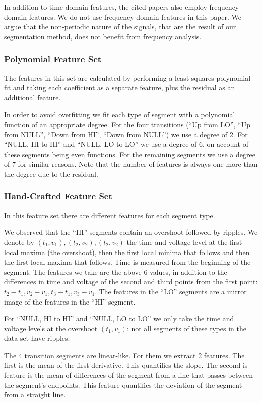 \documentclass[conference]{IEEEtran}
\begin{document}
  In addition to time-domain features, the cited papers also employ frequency-domain features. We do not use frequency-domain features in this paper. We argue that the non-periodic nature of the signals, that are the result of our segmentation method, does not benefit from frequency analysis.

\subsubsection{Polynomial Feature Set}
  The features in this set are calculated by performing a least squares polynomial fit and taking each coefficient as a separate feature, plus the residual as an additional feature.
  
  In order to avoid overfitting we fit each type of segment with a polynomial function of an appropriate degree. For the four transitions (``Up from LO'', ``Up from NULL'', ``Down from HI'', ``Down from NULL'') we use a degree of 2. For ``NULL, HI to HI'' and ``NULL, LO to LO'' we use a degree of 6, on account of these segments being even functions. For the remaining segments we use a degree of 7 for similar reasons. Note that the number of features is always one more than the degree due to the residual.
  
\subsubsection{Hand-Crafted Feature Set}

  In this feature set there are different features for each segment type.
  
  We observed that the ``HI'' segments contain an overshoot followed by ripples. We denote by \((t_1, v_1), (t_2, v_2), (t_2, v_2)\) the time and voltage level at the first local maxima (the overshoot), then the first local minima that follows and then the first local maxima that follows. Time is measured from the beginning of the segment. The features we take are the above 6 values, in addition to the differences in time and voltage of the second and third points from the first point: \(t_2-t_1, v_2-v_1, t_3-t_1, v_3-v_1\). The features in the ``LO'' segments are a mirror image of the features in the ``HI'' segment.
  
  For ``NULL, HI to HI'' and ``NULL, LO to LO'' we only take the time and voltage levels at the overshoot \((t_1, v_1)\): not all segments of these types in the data set have ripples.
  
  The 4 transition segments are linear-like. For them we extract 2 features. The first is the mean of the first derivative. This quantifies the slope. The second is feature is the mean of differences of the segment from a line that passes between the segment's endpoints. This feature quantifies the deviation of the segment from a straight line.
  
\end{document}

